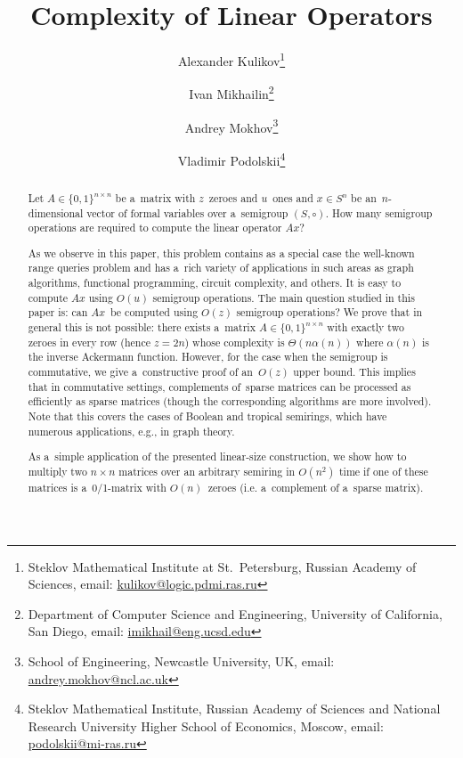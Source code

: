\documentclass[11pt,letterpaper]{article}
\begin{document}

\sloppy
\author{
Alexander Kulikov\thanks{Steklov Mathematical Institute at St.~Petersburg, Russian Academy of Sciences, email: \href{mailto:kulikov@logic.pdmi.ras.ru}{kulikov@logic.pdmi.ras.ru}}
\and
Ivan Mikhailin\thanks{Department of Computer Science and Engineering, University
of California, San Diego, email: \href{mailto:imikhail@eng.ucsd.edu}{imikhail@eng.ucsd.edu}} \and
Andrey Mokhov\thanks{School of Engineering, Newcastle University, UK, email: \href{mailto:andrey.mokhov@ncl.ac.uk}{andrey.mokhov@ncl.ac.uk}}
\and
Vladimir Podolskii\thanks{Steklov Mathematical Institute, Russian Academy of Sciences and
National Research University Higher School of Economics, Moscow, email: \href{mailto:podolskii@mi-ras.ru}{podolskii@mi-ras.ru}}}
\date{}
\title{Complexity of Linear Operators}
\maketitle

\begin{abstract}
Let $A \in \{0,1\}^{n \times n}$ be a~matrix with $z$~zeroes
and $u$~ones and $x \in S^n$ be an~$n$-dimensional vector of
formal variables over a~semigroup $(S, \circ)$.
How many semigroup operations are required to compute the linear operator $Ax$?

As we observe in this paper, this problem contains as a special case the well-known
range queries problem and has a~rich variety of applications in
such areas as graph algorithms, functional programming, circuit complexity,
and others. It is easy to compute $Ax$ using $O(u)$ semigroup
operations.
The main question studied in this paper is:
can $Ax$~be computed using $O(z)$ semigroup operations?
We prove that in general this is not possible: there exists
a~matrix $A \in \{0,1\}^{n \times n}$ with exactly two zeroes in every row
(hence $z=2n$) whose complexity is $\Theta(n\alpha(n))$
where $\alpha(n)$ is the inverse Ackermann function.
However, for the case when the semigroup is commutative,
we give a~constructive proof of an~$O(z)$ upper bound.
This implies that in commutative settings, complements of~sparse 
matrices can
be processed as efficiently as sparse matrices (though the 
corresponding
algorithms are more involved). Note that this covers the 
cases of Boolean and tropical semirings, which have numerous 
applications, e.g., in graph theory.

As a~simple application of the presented linear-size construction, 
we show
how to multiply two $n\times n$ matrices over an arbitrary 
semiring in $O(n^2)$
time if one of these matrices is a~0/1-matrix with $O(n)$~zeroes 
(i.e. a~complement of a~sparse matrix). 
\end{abstract}
\end{document}
